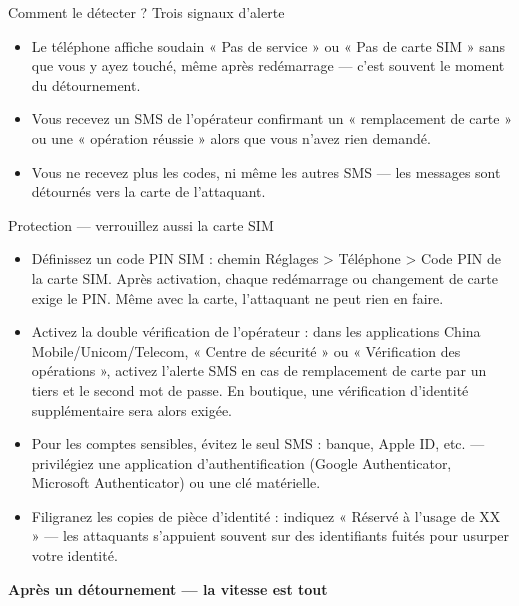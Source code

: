 \begin{tcbinfo}{Comment le détecter ? Trois signaux d'alerte}
\begin{itemize}
  \item Le téléphone affiche soudain « Pas de service » ou « Pas de carte SIM » sans que vous y ayez touché, même après redémarrage — c'est souvent le moment du détournement.
  \item Vous recevez un SMS de l'opérateur confirmant un « remplacement de carte » ou une « opération réussie » alors que vous n'avez rien demandé.
  \item Vous ne recevez plus les codes, ni même les autres SMS — les messages sont détournés vers la carte de l'attaquant.
\end{itemize}

\end{tcbinfo}

\begin{tcbwarn}{Protection — verrouillez aussi la carte SIM}
\begin{itemize}
  \item Définissez un code PIN SIM : chemin Réglages > Téléphone > Code PIN de la carte SIM. Après activation, chaque redémarrage ou changement de carte exige le PIN. Même avec la carte, l'attaquant ne peut rien en faire.
  \item Activez la double vérification de l'opérateur : dans les applications China Mobile/Unicom/Telecom, « Centre de sécurité » ou « Vérification des opérations », activez l'alerte SMS en cas de remplacement de carte par un tiers et le second mot de passe. En boutique, une vérification d'identité supplémentaire sera alors exigée.
  \item Pour les comptes sensibles, évitez le seul SMS : banque, Apple ID, etc. — privilégiez une application d'authentification (Google Authenticator, Microsoft Authenticator) ou une clé matérielle.
  \item Filigranez les copies de pièce d'identité : indiquez « Réservé à l'usage de XX » — les attaquants s'appuient souvent sur des identifiants fuités pour usurper votre identité.
\end{itemize}

\end{tcbwarn}

\textbf{Après un détournement — la vitesse est tout}\par


